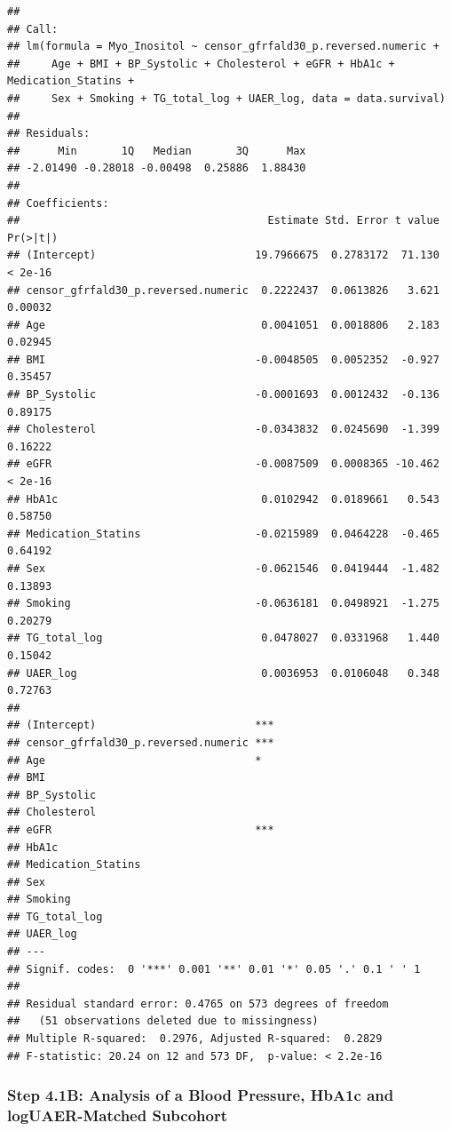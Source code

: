 \documentclass[]{article}
\begin{document}
\begin{verbatim}
## 
## Call:
## lm(formula = Myo_Inositol ~ censor_gfrfald30_p.reversed.numeric + 
##     Age + BMI + BP_Systolic + Cholesterol + eGFR + HbA1c + Medication_Statins + 
##     Sex + Smoking + TG_total_log + UAER_log, data = data.survival)
## 
## Residuals:
##      Min       1Q   Median       3Q      Max 
## -2.01490 -0.28018 -0.00498  0.25886  1.88430 
## 
## Coefficients:
##                                       Estimate Std. Error t value Pr(>|t|)
## (Intercept)                         19.7966675  0.2783172  71.130  < 2e-16
## censor_gfrfald30_p.reversed.numeric  0.2222437  0.0613826   3.621  0.00032
## Age                                  0.0041051  0.0018806   2.183  0.02945
## BMI                                 -0.0048505  0.0052352  -0.927  0.35457
## BP_Systolic                         -0.0001693  0.0012432  -0.136  0.89175
## Cholesterol                         -0.0343832  0.0245690  -1.399  0.16222
## eGFR                                -0.0087509  0.0008365 -10.462  < 2e-16
## HbA1c                                0.0102942  0.0189661   0.543  0.58750
## Medication_Statins                  -0.0215989  0.0464228  -0.465  0.64192
## Sex                                 -0.0621546  0.0419444  -1.482  0.13893
## Smoking                             -0.0636181  0.0498921  -1.275  0.20279
## TG_total_log                         0.0478027  0.0331968   1.440  0.15042
## UAER_log                             0.0036953  0.0106048   0.348  0.72763
##                                        
## (Intercept)                         ***
## censor_gfrfald30_p.reversed.numeric ***
## Age                                 *  
## BMI                                    
## BP_Systolic                            
## Cholesterol                            
## eGFR                                ***
## HbA1c                                  
## Medication_Statins                     
## Sex                                    
## Smoking                                
## TG_total_log                           
## UAER_log                               
## ---
## Signif. codes:  0 '***' 0.001 '**' 0.01 '*' 0.05 '.' 0.1 ' ' 1
## 
## Residual standard error: 0.4765 on 573 degrees of freedom
##   (51 observations deleted due to missingness)
## Multiple R-squared:  0.2976, Adjusted R-squared:  0.2829 
## F-statistic: 20.24 on 12 and 573 DF,  p-value: < 2.2e-16
\end{verbatim}

\newpage

\hypertarget{step-4.1b-analysis-of-a-blood-pressure-hba1c-and-loguaer-matched-subcohort-1}{%
\subsubsection{Step 4.1B: Analysis of a Blood Pressure, HbA1c and
logUAER-Matched
Subcohort}\label{step-4.1b-analysis-of-a-blood-pressure-hba1c-and-loguaer-matched-subcohort-1}}
\end{document}
